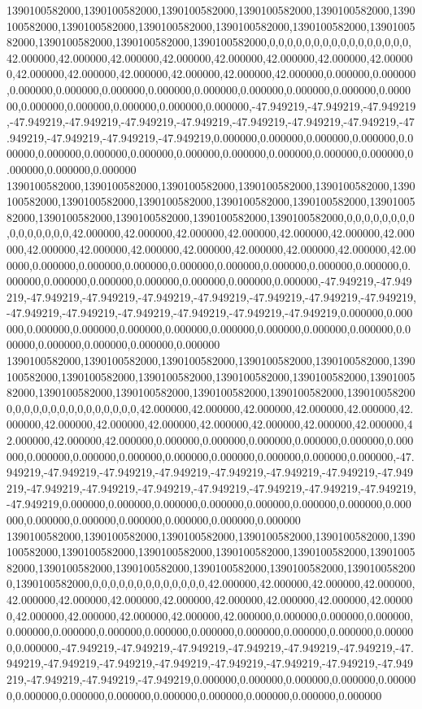 1390100582000,1390100582000,1390100582000,1390100582000,1390100582000,1390100582000,1390100582000,1390100582000,1390100582000,1390100582000,1390100582000,1390100582000,1390100582000,1390100582000,0,0,0,0,0,0,0,0,0,0,0,0,0,0,0,0,42.000000,42.000000,42.000000,42.000000,42.000000,42.000000,42.000000,42.000000,42.000000,42.000000,42.000000,42.000000,42.000000,42.000000,0.000000,0.000000,0.000000,0.000000,0.000000,0.000000,0.000000,0.000000,0.000000,0.000000,0.000000,0.000000,0.000000,0.000000,0.000000,0.000000,-47.949219,-47.949219,-47.949219,-47.949219,-47.949219,-47.949219,-47.949219,-47.949219,-47.949219,-47.949219,-47.949219,-47.949219,-47.949219,-47.949219,0.000000,0.000000,0.000000,0.000000,0.000000,0.000000,0.000000,0.000000,0.000000,0.000000,0.000000,0.000000,0.000000,0.000000,0.000000,0.000000
1390100582000,1390100582000,1390100582000,1390100582000,1390100582000,1390100582000,1390100582000,1390100582000,1390100582000,1390100582000,1390100582000,1390100582000,1390100582000,1390100582000,1390100582000,0,0,0,0,0,0,0,0,0,0,0,0,0,0,0,42.000000,42.000000,42.000000,42.000000,42.000000,42.000000,42.000000,42.000000,42.000000,42.000000,42.000000,42.000000,42.000000,42.000000,42.000000,0.000000,0.000000,0.000000,0.000000,0.000000,0.000000,0.000000,0.000000,0.000000,0.000000,0.000000,0.000000,0.000000,0.000000,0.000000,-47.949219,-47.949219,-47.949219,-47.949219,-47.949219,-47.949219,-47.949219,-47.949219,-47.949219,-47.949219,-47.949219,-47.949219,-47.949219,-47.949219,-47.949219,0.000000,0.000000,0.000000,0.000000,0.000000,0.000000,0.000000,0.000000,0.000000,0.000000,0.000000,0.000000,0.000000,0.000000,0.000000
1390100582000,1390100582000,1390100582000,1390100582000,1390100582000,1390100582000,1390100582000,1390100582000,1390100582000,1390100582000,1390100582000,1390100582000,1390100582000,1390100582000,1390100582000,1390100582000,0,0,0,0,0,0,0,0,0,0,0,0,0,0,42.000000,42.000000,42.000000,42.000000,42.000000,42.000000,42.000000,42.000000,42.000000,42.000000,42.000000,42.000000,42.000000,42.000000,42.000000,42.000000,0.000000,0.000000,0.000000,0.000000,0.000000,0.000000,0.000000,0.000000,0.000000,0.000000,0.000000,0.000000,0.000000,0.000000,-47.949219,-47.949219,-47.949219,-47.949219,-47.949219,-47.949219,-47.949219,-47.949219,-47.949219,-47.949219,-47.949219,-47.949219,-47.949219,-47.949219,-47.949219,-47.949219,0.000000,0.000000,0.000000,0.000000,0.000000,0.000000,0.000000,0.000000,0.000000,0.000000,0.000000,0.000000,0.000000,0.000000
1390100582000,1390100582000,1390100582000,1390100582000,1390100582000,1390100582000,1390100582000,1390100582000,1390100582000,1390100582000,1390100582000,1390100582000,1390100582000,1390100582000,1390100582000,1390100582000,1390100582000,0,0,0,0,0,0,0,0,0,0,0,0,0,42.000000,42.000000,42.000000,42.000000,42.000000,42.000000,42.000000,42.000000,42.000000,42.000000,42.000000,42.000000,42.000000,42.000000,42.000000,42.000000,42.000000,0.000000,0.000000,0.000000,0.000000,0.000000,0.000000,0.000000,0.000000,0.000000,0.000000,0.000000,0.000000,0.000000,-47.949219,-47.949219,-47.949219,-47.949219,-47.949219,-47.949219,-47.949219,-47.949219,-47.949219,-47.949219,-47.949219,-47.949219,-47.949219,-47.949219,-47.949219,-47.949219,-47.949219,0.000000,0.000000,0.000000,0.000000,0.000000,0.000000,0.000000,0.000000,0.000000,0.000000,0.000000,0.000000,0.000000
